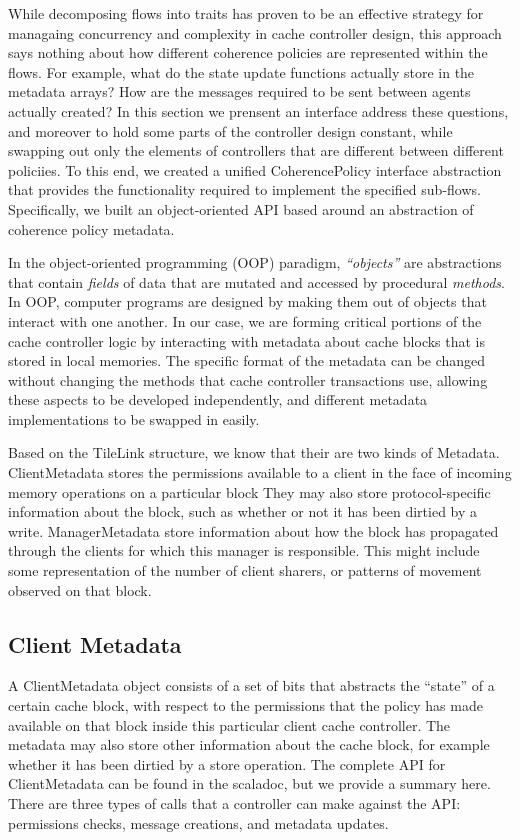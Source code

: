 While decomposing flows into traits has proven to be an effective strategy for managaing concurrency and complexity in cache controller design,
this approach says nothing about how different coherence policies are represented within the flows.
For example, what do the state update functions actually store in the metadata arrays?
How are the messages required to be sent between agents actually created?
In this section we prensent an interface address these questions, and moreover to 
hold some parts of the controller design constant, while swapping out only the
elements of controllers that are different between different policiies.
To this end, we created a unified CoherencePolicy interface abstraction that provides the functionality required to implement the specified sub-flows.
Specifically, we built an object-oriented API based around an abstraction of coherence policy metadata.

In the object-oriented programming (OOP) paradigm, \emph{``objects''} are abstractions that contain \emph{fields} of data that are mutated and accessed by procedural \emph{methods}.
In OOP, computer programs are designed by making them out of objects that interact with one another.
In our case, we are forming critical portions of the cache controller logic by interacting with metadata about cache blocks that is stored in local memories.
The specific format of the metadata can be changed without changing the methods that cache controller transactions use,
allowing these aspects to be developed independently, and different metadata implementations to be swapped in easily.


Based on the TileLink structure, we know that their are two kinds of Metadata.
ClientMetadata stores the permissions available to a client in the face of incoming memory operations on a particular block
They may also store protocol-specific information about the block, such as whether or not it has been dirtied by a write.
ManagerMetadata store information about how the block has propagated through the clients for which this manager is responsible.
This might include some representation of the number of client sharers, or patterns of movement observed on that block.

\subsection{Client Metadata} 

A ClientMetadata object consists of a set of bits that abstracts the “state” of a certain cache block,
with respect to the permissions that the policy has made available on that block inside this particular client cache controller.
The metadata may also store other information about the cache block,
for example whether it has been dirtied by a store operation.
The complete API for ClientMetadata can be found in the scaladoc, but we provide a summary here.
There are three types of calls that a controller can make against the API:
permissions checks, message creations, and metadata updates.

